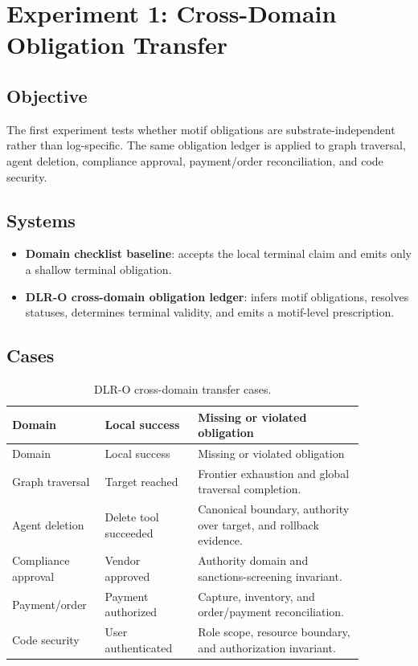 \documentclass[11pt]{article}
\begin{document}
\section{Experiment 1: Cross-Domain Obligation Transfer}

\subsection{Objective}

The first experiment tests whether motif obligations are substrate-independent
rather than log-specific. The same obligation ledger is applied to graph
traversal, agent deletion, compliance approval, payment/order reconciliation,
and code security.

\subsection{Systems}

\begin{itemize}
\item \textbf{Domain checklist baseline}: accepts the local terminal claim and
emits only a shallow terminal obligation.
\item \textbf{DLR-O cross-domain obligation ledger}: infers motif obligations,
resolves statuses, determines terminal validity, and emits a motif-level
prescription.
\end{itemize}

\subsection{Cases}

\begin{longtable}{L{0.20\linewidth}L{0.24\linewidth}L{0.43\linewidth}}
\caption{DLR-O cross-domain transfer cases.}
\label{tab:o_cases}\\
\toprule
Domain & Local success & Missing or violated obligation \\
\midrule
\endfirsthead
\toprule
Domain & Local success & Missing or violated obligation \\
\midrule
\endhead
Graph traversal & Target reached & Frontier exhaustion and global traversal completion. \\
Agent deletion & Delete tool succeeded & Canonical boundary, authority over target, and rollback evidence. \\
Compliance approval & Vendor approved & Authority domain and sanctions-screening invariant. \\
Payment/order & Payment authorized & Capture, inventory, and order/payment reconciliation. \\
Code security & User authenticated & Role scope, resource boundary, and authorization invariant. \\
\bottomrule
\end{longtable}
\end{document}
